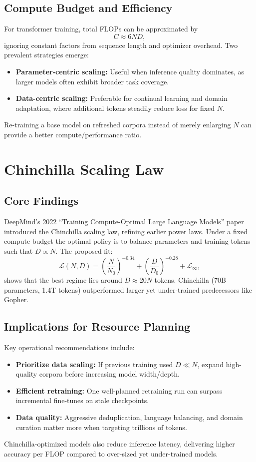 \documentclass{article}
\begin{document}
\subsection{Compute Budget and Efficiency}
For transformer training, total FLOPs can be approximated by
\begin{equation}
  C \approx 6 N D,
\end{equation}
ignoring constant factors from sequence length and optimizer overhead. Two prevalent strategies emerge:
\begin{itemize}
  \item \textbf{Parameter-centric scaling:} Useful when inference quality dominates, as larger models often exhibit broader task coverage.
  \item \textbf{Data-centric scaling:} Preferable for continual learning and domain adaptation, where additional tokens steadily reduce loss for fixed $N$.
\end{itemize}
Re-training a base model on refreshed corpora instead of merely enlarging $N$ can provide a better compute/performance ratio.

\section{Chinchilla Scaling Law}
\subsection{Core Findings}
DeepMind's 2022 ``Training Compute-Optimal Large Language Models'' paper introduced the Chinchilla scaling law, refining earlier power laws. Under a fixed compute budget the optimal policy is to balance parameters and training tokens such that $D \propto N$. The proposed fit:
\begin{equation}
  \mathcal{L}(N, D) = \left(\frac{N}{N_0}\right)^{-0.34} + \left(\frac{D}{D_0}\right)^{-0.28} + \mathcal{L}_\infty,
\end{equation}
shows that the best regime lies around $D \approx 20 N$ tokens. Chinchilla (70B parameters, 1.4T tokens) outperformed larger yet under-trained predecessors like Gopher.

\subsection{Implications for Resource Planning}
Key operational recommendations include:
\begin{itemize}
  \item \textbf{Prioritize data scaling:} If previous training used $D \ll N$, expand high-quality corpora before increasing model width/depth.
  \item \textbf{Efficient retraining:} One well-planned retraining run can surpass incremental fine-tunes on stale checkpoints.
  \item \textbf{Data quality:} Aggressive deduplication, language balancing, and domain curation matter more when targeting trillions of tokens.
\end{itemize}
Chinchilla-optimized models also reduce inference latency, delivering higher accuracy per FLOP compared to over-sized yet under-trained models.
\end{document}
